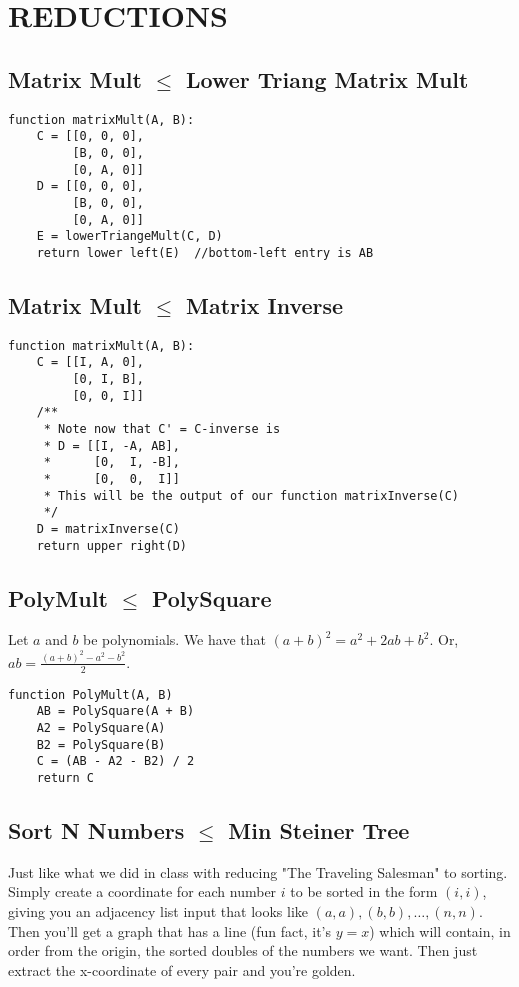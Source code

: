 \documentclass[12pt]{article}
\providecommand{\reducible}[2]{
  \textbf{#1} $\leq$ \textbf{#2}
}
\begin{document}
\section{REDUCTIONS}
\subsection{\reducible{Matrix Mult}{Lower Triang Matrix Mult}}
\begin{lstlisting}
function matrixMult(A, B):
    C = [[0, 0, 0],
         [B, 0, 0],
         [0, A, 0]]
    D = [[0, 0, 0],
         [B, 0, 0],
         [0, A, 0]]
    E = lowerTriangeMult(C, D)
    return lower left(E)  //bottom-left entry is AB
\end{lstlisting}


\subsection{\reducible{Matrix Mult}{Matrix Inverse}}
\begin{lstlisting}
function matrixMult(A, B):
    C = [[I, A, 0],
         [0, I, B],
         [0, 0, I]]
    /**
     * Note now that C' = C-inverse is
     * D = [[I, -A, AB],
     *      [0,  I, -B],
     *      [0,  0,  I]]
     * This will be the output of our function matrixInverse(C)
     */
    D = matrixInverse(C)
    return upper right(D)
\end{lstlisting}


\subsection{\reducible{PolyMult}{PolySquare}}
Let $a$ and $b$ be polynomials.
We have that $(a+b)^2 = a^2 + 2ab + b^2$.
Or, $\displaystyle ab = \frac{(a+b)^2 - a^2 - b^2}{2}$.\\
\begin{lstlisting}
function PolyMult(A, B)
    AB = PolySquare(A + B)
    A2 = PolySquare(A)
    B2 = PolySquare(B)
    C = (AB - A2 - B2) / 2
    return C
\end{lstlisting}

\subsection{\reducible{Sort N Numbers}{Min Steiner Tree}}
Just like what we did in class with reducing "The Traveling Salesman" to sorting.
Simply create a coordinate for each number $i$ to be sorted in the form $(i,i)$,
giving you an adjacency list input that looks like $(a,a),(b,b), \dots, (n,n)$.
Then you'll get a graph that has a line (fun fact, it's $y=x$) which will contain,
in order from the origin, the sorted doubles of the numbers we want.
Then just extract the x-coordinate of every pair and you're golden.
\end{document}
